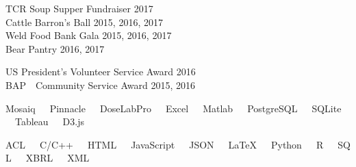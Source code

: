 \documentclass[10pt]{article}
\begin{document}
\begin{description}[leftmargin=!,labelwidth=3cm,align=left,itemsep=-9px,partopsep=-5px]
%
%
\item[Volunteering]
	TCR Soup Supper Fundraiser \hfill 2017\\
	Cattle Barron's Ball \hfill 2015, 2016, 2017\\
	Weld Food Bank Gala  \hfill 2015, 2016, 2017\\
	Bear Pantry	         \hfill       2016, 2017
\item[\rule{196mm}{0.5pt}]

%
%
\item[Awards]
    US President's Volunteer Service Award \hfill 2016\\
    BAP\ \ Community Service Award \hfill 2015, 2016
\item[\rule{196mm}{0.5pt}]

%
%
\item[Tools]
    Mosaiq\ \ \ Pinnacle\ \ \ DoseLabPro\ \ \ Excel\ \ \ Matlab\ \ \ PostgreSQL\ \ \ SQLite\ \ \ Tableau\ \ \ D3.js\\

\item[Languages]
    ACL\ \ \ C/C++\ \ \ HTML\ \ \ JavaScript\ \ \ JSON\ \ \ LaTeX\ \ \ Python\ \ \ R\ \ \ SQL\ \ \ XBRL\ \ \ XML



\end{description}
\end{document}
